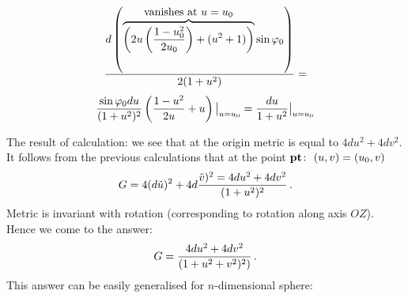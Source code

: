                    $$
                   {
          d\left(\overbrace{\left(
    2u\left({1-u_0^2\over 2u_0}\right)+(u^2+1)
\right)}^{\hbox{vanishes at $u=u_0$}}\sin\varphi_0\right)
              \over 2(1+u^2)
                 }=
                   $$
              $$
       {\sin\varphi_0du\over (1+u^2)^2}\left({1-u^2\over 2u}+u\right)
               \big\vert_{u=u_0}={du\over 1+u^2}\big\vert_{u=u_0}
              $$

  The result of calculation: we see that at the origin
     metric is equal to $4du^2+4dv^2$. It follows from the previous calculations
that at the point ${\bf pt}\colon\,\, (u,v)=(u_0,v)$
               $$
    G=4(d\tilde u)^2+4d{\tilde v)^2=4du^2+4dv^2\over (1+u^2)^2}\,.
               $$Metric is invariant with rotation (corresponding to rotation
along axis $OZ$). Hence we come to the answer:
                   $$
          G={4du^2+4dv^2\over (1+u^2+v^2)^2)}\,.
                   $$
This answer can be easily generalised for $n$-dimensional sphere:
       

\bye

